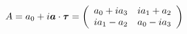 \begin{equation}
A=a_0+i\mbox{\boldmath$a$}\cdot \mbox{\boldmath$\tau$}=\left(
\begin{array}{cc}
a_0+ia_3 & ia_1+a_2 \\
ia_1-a_2 & a_0-ia_3
\end{array}
\right)
\end{equation}

